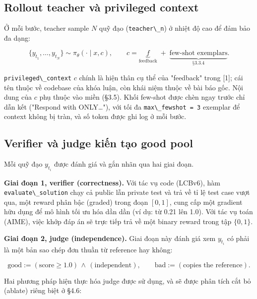 \subsection{Rollout teacher và privileged context}\label{teacher-rollout-and-privileged-context}

Ở mỗi bước, teacher sample \(N\) quỹ đạo (\passthrough{\lstinline!teacher\_n!}) ở nhiệt độ cao để đảm bảo đa dạng:

\[
\{y_{t_1}, \dots, y_{t_N}\} \sim \pi_\theta(\cdot \mid x, c), \qquad c = \underbrace{f}_{\text{feedback}} \;+\; \underbrace{\text{few-shot exemplars}}_{\text{§3.3.4}}.
\]

\passthrough{\lstinline!privileged\_context!} \(c\) chính là hiện thân cụ thể của "feedback" trong {[}1{]}; cái tên thuộc về codebase của khóa luận, còn khái niệm thuộc về bài báo gốc. Nội dung của \(c\) phụ thuộc vào miền (§3.5). Khối few-shot được chèn ngay trước chỉ dẫn kết ("Respond with ONLY\ldots{}"), với tối đa \passthrough{\lstinline!max\_fewshot = 3!} exemplar để context không bị tràn, và số token được ghi log ở mỗi bước.

\subsection{Verifier và judge kiến tạo good pool}\label{verifier-and-judge-produce-the-good-pool}

Mỗi quỹ đạo \(y_{t_i}\) được đánh giá và gắn nhãn qua hai giai đoạn.

\textbf{Giai đoạn 1, verifier (correctness).} Với tác vụ code (LCBv6), hàm \passthrough{\lstinline!evaluate\_solution!} chạy cả public lẫn private test và trả về tỉ lệ test case vượt qua, một reward phân bậc (graded) trong đoạn \([0,1]\), cung cấp một gradient hữu dụng để mô hình tối ưu hóa dần dần (ví dụ: từ 0.21 lên 1.0). Với tác vụ toán (AIME), việc khớp đáp án sẽ trực tiếp trả về một binary reward trong tập \(\{0,1\}\).

\textbf{Giai đoạn 2, judge (independence).} Giai đoạn này đánh giá xem \(y_{t_i}\) có phải là một bản sao chép đơn thuần từ reference hay không:

\[
\text{good} := (\text{score} \ge 1.0) \,\wedge\, (\text{independent}), \qquad \text{bad} := (\text{copies the reference}).
\]

Hai phương pháp hiện thực hóa judge được sử dụng, và sẽ được phân tích cắt bỏ (ablate) riêng biệt ở §4.6:

